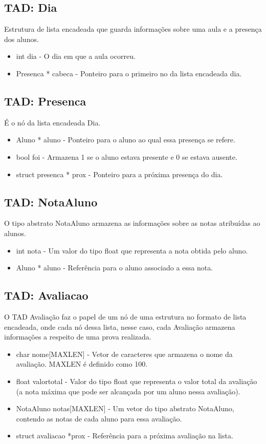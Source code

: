 \documentclass{article}
\begin{document}
\subsection{TAD: Dia}
Estrutura de lista encadeada que guarda informações sobre uma aula e a presença dos alunos.
\begin{itemize}
    \item int dia - O dia em que a aula ocorreu.
    \item Presenca * cabeca - Ponteiro para o primeiro no da lista encadeada dia.
\end{itemize}

\subsection{TAD: Presenca}
É o nó da lista encadeada Dia.
\begin{itemize}
    \item Aluno * aluno - Ponteiro para o aluno ao qual essa presença se refere.
    \item bool foi - Armazena 1 se o aluno estava presente e 0 se estava ausente.
    \item struct presenca * prox - Ponteiro  para a próxima presença do dia.
\end{itemize}


\subsection{TAD: NotaAluno}
O tipo abstrato NotaAluno armazena as informações sobre as notas atribuídas ao alunos.
\begin{itemize}
    \item int nota - Um valor do tipo float que representa a nota obtida pelo aluno.
    \item Aluno * aluno - Referência para o aluno associado a essa nota.
\end{itemize}

\subsection{TAD: Avaliacao}
O TAD Avaliação faz o papel de um nó de uma estrutura no formato de lista encadeada, onde cada nó dessa lista, nesse caso, cada Avaliação armazena informações a respeito de uma prova realizada.
\begin{itemize}
    \item char nome[MAXLEN] - Vetor de caracteres que armazena o nome da avaliação. MAXLEN é definido como 100.
    \item float valortotal - Valor do tipo float que representa o valor total da avaliação (a nota máxima que pode ser alcançada por um aluno nessa avaliação).
    \item NotaAluno notas[MAXLEN] - Um vetor do tipo abstrato NotaAluno, contendo as notas de cada aluno para essa avaliação.
    \item struct avaliacao *prox - Referência para a próxima avaliação na lista.
\end{itemize}
\end{document}
